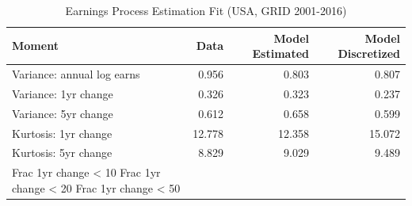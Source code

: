 \begin{table}
\caption{Earnings Process Estimation Fit (USA, GRID 2001-2016)}
\label{tab:earnings_fit_usa}
\begin{tabular}{lrrr}
\toprule
Moment & Data & Model Estimated & Model Discretized \\
\midrule
Variance: annual log earns & 0.956 & 0.803 & 0.807 \\
Variance: 1yr change & 0.326 & 0.323 & 0.237 \\
Variance: 5yr change & 0.612 & 0.658 & 0.599 \\
Kurtosis: 1yr change & 12.778 & 12.358 & 15.072 \\
Kurtosis: 5yr change & 8.829 & 9.029 & 9.489 \\
Frac 1yr change < 10%
Frac 1yr change < 20%
Frac 1yr change < 50%
\bottomrule
\end{tabular}
\end{table}
